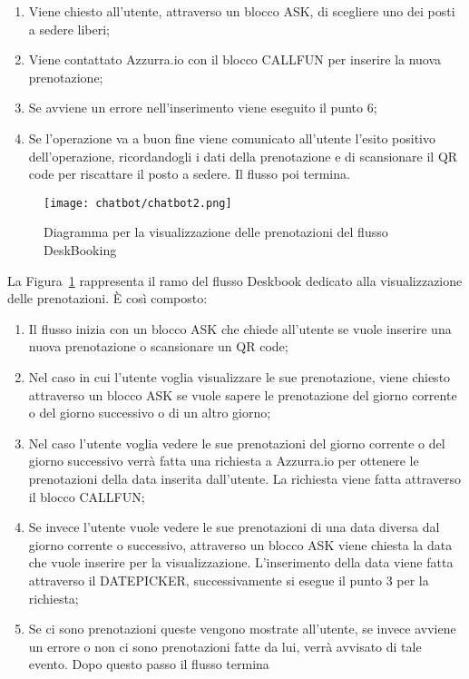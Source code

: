 \begin{enumerate}
	\item Viene chiesto all'utente, attraverso un blocco ASK, di scegliere uno dei posti a sedere liberi;
	\item Viene contattato Azzurra.io con il blocco CALLFUN per inserire la nuova prenotazione;
	\item Se avviene un errore nell'inserimento viene eseguito il punto 6;
	\item Se l'operazione va a buon fine viene comunicato all'utente l'esito positivo dell'operazione, ricordandogli i dati della prenotazione e di scansionare il \gls{QR code}\ap{[g]} per riscattare il posto a sedere. Il flusso poi termina.
\end{enumerate}

\begin{figure}[h]
	\centering
	\texttt{[image: chatbot/chatbot2.png]}
	\caption{Diagramma per la visualizzazione delle prenotazioni del flusso DeskBooking}\label{fig:vis}
\end{figure}

La Figura~\ref{fig:vis} rappresenta il ramo del flusso Deskbook dedicato alla visualizzazione delle prenotazioni. È così composto:
\begin{enumerate}
	\item Il flusso inizia con un blocco ASK che chiede all'utente se vuole inserire una nuova prenotazione o scansionare un \gls{QR code}\ap{[g]};
	\item Nel caso in cui l'utente voglia visualizzare le sue prenotazione, viene chiesto attraverso un blocco ASK se vuole sapere le prenotazione del giorno corrente o del giorno successivo o di un altro giorno;
	\item Nel caso l'utente voglia vedere le sue prenotazioni del giorno corrente o del giorno successivo verrà fatta una richiesta a Azzurra.io per ottenere le prenotazioni della data inserita dall'utente. La richiesta viene fatta attraverso il blocco CALLFUN;
	\item Se invece l'utente vuole vedere le sue prenotazioni di una data diversa dal giorno corrente o successivo, attraverso un blocco ASK viene chiesta la data che vuole inserire per la visualizzazione. L'inserimento della data viene fatta attraverso il DATEPICKER, successivamente si esegue il punto 3 per la richiesta;
	\item Se ci sono prenotazioni queste vengono mostrate all'utente, se invece avviene un errore o non ci sono prenotazioni fatte da lui, verrà avvisato di tale evento. Dopo questo passo il flusso termina\\
\end{enumerate}


